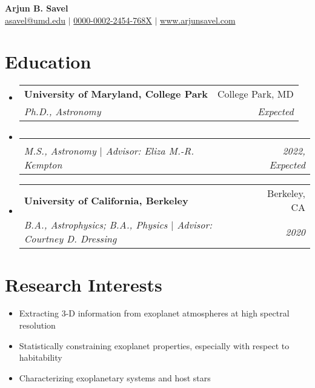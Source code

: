 \documentclass[letterpaper,10.5pt]{article}
\makeatletter
\newcommand{\resumeItem}[2]{
  \item\small{
    \textbf{#1}{#2 \vspace{-2pt}}
  }
}
\newcommand{\resumeItemNoBullet}[2]{
  \item[]\small{
    \hspace{-9pt}\textbf{#1}{: #2 \vspace{-6pt}}
  }
}
\newcommand{\resumeSubheading}[4]{
  \vspace{-1pt}\item[]
  \begin{tabular*}{0.98\textwidth}{l@{\extracolsep{\fill}}r}
      \hspace{-10pt}\textbf{#1} & #2 \\
      \hspace{-10pt}\textit{\small#3} & \textit{\small #4} \\
    \end{tabular*}\vspace{-5pt}
}
\newcommand{\resumeSubHeadingListStart}{\begin{itemize}[leftmargin=*]}
\newcommand{\resumeSubHeadingListEnd}{\end{itemize}}
\newcommand{\resumeItemListStart}{\begin{itemize}}
\newcommand{\resumeItemListEnd}{\end{itemize}\vspace{-5pt}}
\newcommand{\shorterSection}[1]{\vspace{-10pt}\section{#1}}
\makeatother
\begin{document}
\thispagestyle{empty}

\begin{center}
  \small \textbf{\huge Arjun B. Savel} \\
  \vspace{5pt}
  \textsf{\small \href{href="mailto:asavel@umd.edu"}{asavel@umd.edu}} $\vert$   \href{https://orcid.org/0000-0002-2454-768X/}{0000-0002-2454-768X} $\vert$ \href{www.arjunsavel.com}{www.arjunsavel.com} 
\end{center}

\shorterSection{Education}
  \resumeSubHeadingListStart
    \resumeSubheading
      {University of Maryland, College Park}{College Park, MD}
      {Ph.D., Astronomy}{Expected}{
    }
    \vspace{-17pt}
    \resumeSubheading
    {}{}{M.S., Astronomy $\vert$ Advisor: Eliza M.-R. Kempton}{2022, Expected}{
    }
    \vspace{5pt}
    \resumeSubheading
      {University of California, Berkeley}{Berkeley, CA}
      {B.A., Astrophysics; B.A., Physics $\vert$ Advisor: Courtney D. Dressing}{2020}{
    }
    
  \resumeSubHeadingListEnd
  
 
\shorterSection{Research Interests}
\resumeItemListStart
\resumeItem{}{Extracting 3-D information from exoplanet atmospheres at high spectral resolution}
\resumeItem{}{Statistically constraining exoplanet properties, especially with respect to habitability}{}
\resumeItem{}{Characterizing exoplanetary systems and host stars}{}

\resumeItemListEnd
\vspace{5pt}
\end{document}
